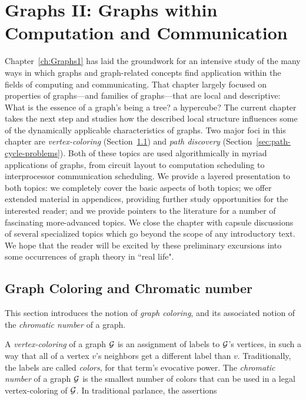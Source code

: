 
\chapter{Graphs II:
Graphs within Computation and Communication}
\label{ch:Graphs2}

Chapter~\ref{ch:Graphs1} has laid the groundwork for an intensive study of the many 
ways in which graphs and graph-related concepts find application within the fields of 
computing and communicating.  That chapter largely focused on properties of
graphs---and families of graphs---that are local and descriptive: What is the essence of
a graph's being a tree? a hypercube?  The current chapter takes the next step and studies
how the described local structure influences some of the dynamically applicable characteristics
of graphs.  Two major foci in this chapter are {\em vertex-coloring} (Section~\ref{sec:graph-color})
and {\em path discovery} (Section~\ref{sec:path-cycle-problems}).  Both of these topics are used
algorithmically in myriad applications of graphs, from circuit layout to computation scheduling
to interprocessor communication scheduling.  We provide a layered presentation to both topics:
we completely cover the basic aspects of both topics; we offer extended material in appendices,
providing further study opportunities for the interested reader; and we provide pointers to the 
literature for a number of fascinating more-advanced topics.  We close the chapter with capsule
discussions of several specialized topics which go beyond the scope of any introductory text.  We 
hope that the reader will be excited by these preliminary excursions into some occurrences of
graph theory in ``real life".




\section{Graph Coloring and Chromatic number}
\label{sec:graph-color}

This section introduces the notion of {\it graph coloring}, and its
associated notion of the {\it chromatic number} of a graph.

A {\it vertex-coloring} of a graph $\mbox{$\cal G$}$ is an assignment of labels to $\mbox{$\cal G$}$'s vertices, 
in such a way that all of a vertex $v$'s neighbors get a different label than $v$.  Traditionally,
the labels are called {\it colors}, for that term's evocative power.  The {\it chromatic number} of a graph
$\mbox{$\cal G$}$ is the smallest number of colors that can be used in a legal
vertex-coloring of $\mbox{$\cal G$}$.  In traditional parlance, the assertions

